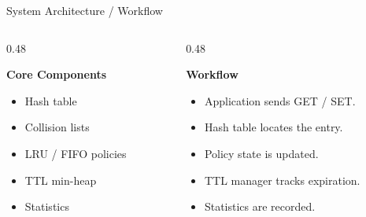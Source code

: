 \documentclass[aspectratio=169,10pt]{beamer}
\begin{document}
\begin{frame}{System Architecture / Workflow}
\begin{columns}[T]
\begin{column}{0.48\textwidth}

\textbf{\color{GEUBlue}Core Components}

\begin{itemize}

\item Hash table
\item Collision lists
\item LRU / FIFO policies
\item TTL min-heap
\item Statistics

\end{itemize}

\end{column}

\begin{column}{0.48\textwidth}

\textbf{\color{GEUBlue}Workflow}

\begin{itemize}

\item Application sends GET / SET.
\item Hash table locates the entry.
\item Policy state is updated.
\item TTL manager tracks expiration.
\item Statistics are recorded.

\end{itemize}

\end{column}

\end{columns}

\end{frame}

\end{document}
